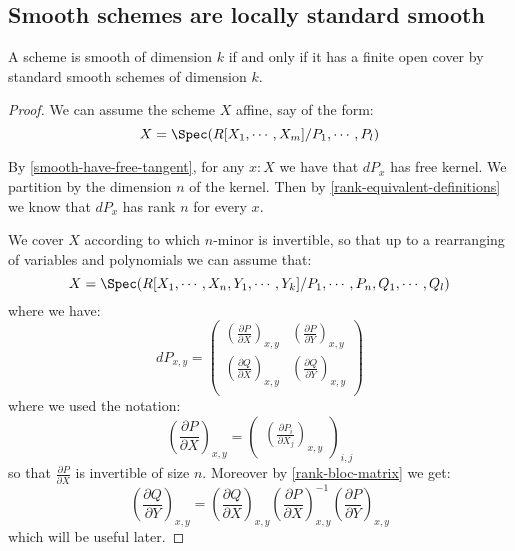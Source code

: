 \subsection{Smooth schemes are locally standard smooth}

\begin{proposition}\label{smooth-are-locally-standard}
A scheme is smooth of dimension $k$ if and only if it has a finite open cover by standard smooth schemes of dimension $k$.
\end{proposition}

\begin{proof}
We can assume the scheme $X$ affine, say of the form:
\[X = \Spec(R[X_1,\cdots,X_m]/P_1,\cdots,P_l)\]

By \cref{smooth-have-free-tangent}, for any $x:X$ we have that $dP_x$ has free kernel. We partition by the dimension $n$ of the kernel. Then by \cref{rank-equivalent-definitions} we know that $dP_x$ has rank $n$ for every $x$.

We cover $X$ according to which $n$-minor is invertible, so that up to a rearranging of variables and polynomials we can assume that:
\[X = \Spec(R[X_1,\cdots,X_n,Y_1,\cdots,Y_k]/P_1,\cdots,P_n,Q_1,\cdots, Q_l)\]
where we have:
\[dP_{x,y} = \begin{pmatrix}
\left(\frac{\partial P}{\partial X}\right)_{x,y} & \left(\frac{\partial P}{\partial Y}\right)_{x,y} \\
\left(\frac{\partial Q}{\partial X}\right)_{x,y} & \left(\frac{\partial Q}{\partial Y}\right)_{x,y} \\
\end{pmatrix}\]
where we used the notation:
\[\left(\frac{\partial P}{\partial X}\right)_{x,y} = \begin{pmatrix}\left(\frac{\partial P_i}{\partial X_j}\right)_{x,y}\end{pmatrix}_{i,j}\]
so that $\frac{\partial P}{\partial X}$ is invertible of size $n$. Moreover by \cref{rank-bloc-matrix} we get:
\[\left(\frac{\partial Q}{\partial Y}\right)_{x,y} = \left(\frac{\partial Q}{\partial X}\right)_{x,y}\left(\frac{\partial P}{\partial X}\right)_{x,y}^{-1} \left(\frac{\partial P}{\partial Y}\right)_{x,y} \]
which will be useful later.


\end{proof}

